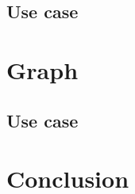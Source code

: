 \documentclass{CRPITStyle}
\renewcommand{\cite}{\citep}
\begin{document}
\cite{usingcolumn}

\subsection{Use case}

\cite{nosql_performance}
\cite{bigtable}


\section{Graph}

\subsection{Use case}

\cite{nosql_performance}

\section{Conclusion}



\end{document}
